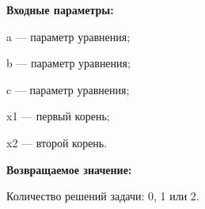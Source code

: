 \textbf{Входные параметры:}
 
a --- параметр уравнения;
 
b --- параметр уравнения;
 
c --- параметр уравнения;
 
x1 --- первый корень;
 
x2 --- второй корень.

\textbf{Возвращаемое значение:}
 
Количество решений задачи: 0, 1 или  2.

